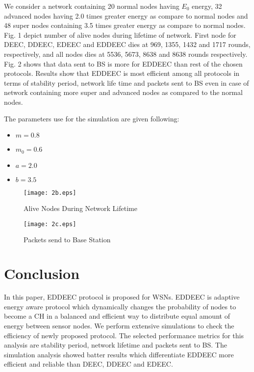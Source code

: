 \documentclass[3p,times,procedia]{elsarticle}
\begin{document}
We consider a network containing 20 normal nodes having $E_{0}$ energy, 32 advanced nodes having 2.0 times greater energy as compare to normal nodes and 48 super nodes containing 3.5 times greater energy as compare to normal nodes. Fig. 1 depict number of alive nodes during lifetime of network. First node for DEEC, DDEEC, EDEEC and EDDEEC dies at 969, 1355, 1432 and 1717 rounds, respectively, and all nodes dies at 5536, 5673, 8638 and 8638 rounds respectively. Fig. 2 shows that data sent to BS is more for EDDEEC than rest of the chosen protocols. Results show that EDDEEC is most efficient among all protocols in terms of stability period, network life time and packets sent to BS even in case of network containing more super and advanced nodes as compared to the normal nodes.

The parameters use for the simulation are given following:

\begin{itemize}
\item$m=0.8$
\item$m_{0}=0.6$
\item$a=2.0$
\item$b=3.5$
\end{itemize}


\begin{figure}[!h]
\centering
\texttt{[image: 2b.eps]}
\caption{Alive Nodes During Network Lifetime}
\end{figure}

\begin{figure}[!h]
\centering
\texttt{[image: 2c.eps]}
\caption{Packets send to Base Station}
\end{figure}

\section{Conclusion}
In this paper, EDDEEC protocol is proposed for WSNs. EDDEEC is adaptive energy aware protocol which dynamically changes the probability of nodes to become a CH in a balanced and efficient way to distribute equal amount of energy between sensor nodes. We perform extensive simulations to check the efficiency of newly proposed protocol. The selected performance metrics for this analysis are stability period, network lifetime and packets sent to BS. The simulation analysis showed batter results which differentiate EDDEEC more efficient and reliable than DEEC, DDEEC and EDEEC.
\end{document}
